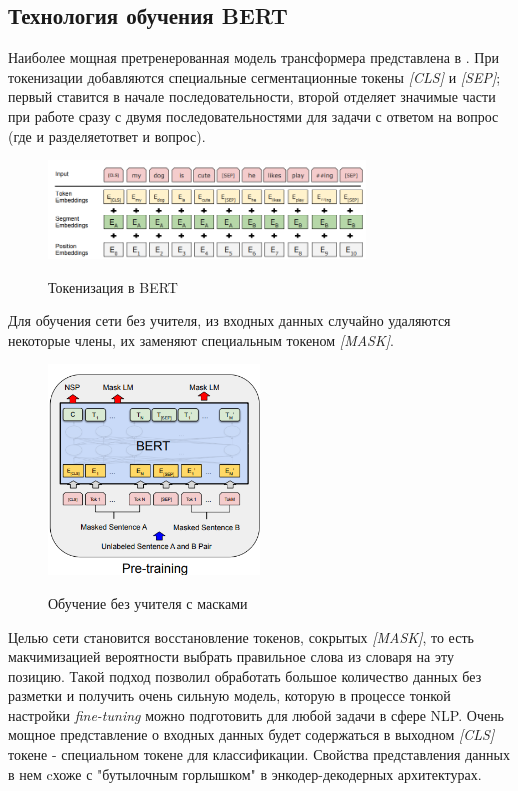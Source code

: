 \subsection{Технология обучения BERT}
Наиболее мощная претренерованная модель трансформера представлена в \cite{bert}. 
При токенизации добавляются специальные сегментационные токены \textit{[CLS]} и \textit{[SEP]}; первый ставится в начале последовательности, второй отделяет значимые части при работе сразу с двумя последовательностями для задачи с ответом на вопрос (где и разделяетответ и вопрос).
\begin{figure}[h]
\caption{Токенизация в BERT}
\centering
\includegraphics[width=0.75\textwidth]{bert_token.png}
\label{bert_token}
\end{figure}
Для обучения сети без учителя, из входных данных случайно удаляются некоторые члены, их заменяют специальным токеном \textit{[MASK]}. 
\begin{figure}[h]
\caption{Обучение без учителя с масками}
\centering
\includegraphics[width=0.5\textwidth]{MLM.png}
\label{mlm}
\end{figure}
Целью сети становится восстановление токенов, сокрытых \textit{[MASK]}, то есть макчимизацией вероятности выбрать правильное слова из словаря на эту позицию. Такой подход позволил обработать большое количество данных без разметки и получить очень сильную модель, которую в процессе тонкой настройки \textit{fine-tuning} можно подготовить для любой задачи в сфере NLP. Очень мощное представление о входных данных будет содержаться в выходном \textit{[CLS]} токене - специальном токене для классификации. Свойства представления данных в нем cхоже с "бутылочным горлышком" в энкодер-декодерных архитектурах.